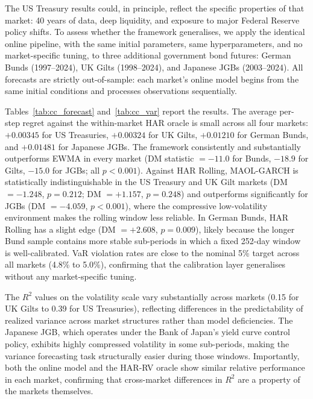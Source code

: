 The US Treasury results could, in principle, reflect the specific properties of that market:
40 years of data, deep liquidity, and exposure to major Federal Reserve policy shifts. To
assess whether the framework generalises, we apply the identical online pipeline, with the
same initial parameters, same hyperparameters, and no market-specific tuning, to three
additional government bond futures: German Bunds (1997--2024), UK Gilts (1998--2024), and
Japanese JGBs (2003--2024). All forecasts are strictly out-of-sample: each market's online
model begins from the same initial conditions and processes observations sequentially.

Tables~\ref{tab:cc_forecast} and~\ref{tab:cc_var} report the results. The average per-step
regret against the within-market HAR oracle is small across all four markets: $+0.00345$ for
US Treasuries, $+0.00324$ for UK Gilts, $+0.01210$ for German Bunds, and $+0.01481$ for
Japanese JGBs. The
framework consistently and substantially outperforms EWMA in every market (DM statistic
$= -11.0$ for Bunds, $-18.9$ for Gilts, $-15.0$ for JGBs; all $p < 0.001$). Against HAR Rolling, MAOL-GARCH is statistically indistinguishable in the US Treasury and
UK Gilt markets (DM $= -1.248$, $p = 0.212$; DM $= +1.157$, $p = 0.248$) and
outperforms significantly for JGBs (DM $= -4.059$, $p < 0.001$), where the compressive
low-volatility environment makes the rolling window less reliable. In German Bunds, HAR
Rolling has a slight edge (DM $= +2.608$, $p = 0.009$), likely because the longer Bund
sample contains more stable sub-periods in which a fixed 252-day window is well-calibrated. VaR violation
rates are close to the nominal 5\% target across all markets (4.8\% to 5.0\%), confirming that
the calibration layer generalises without any market-specific tuning.





The $R^2$ values on the volatility scale vary substantially across markets (0.15 for UK Gilts
to 0.39 for US Treasuries), reflecting differences in the predictability of realized variance
across market structures rather than model deficiencies. The Japanese JGB, which operates
under the Bank of Japan's yield curve control policy, exhibits highly compressed volatility
in some sub-periods, making the variance forecasting task structurally easier during those
windows. Importantly, both the online model and the HAR-RV oracle show similar relative
performance in each market, confirming that cross-market differences in $R^2$ are a property
of the markets themselves.

